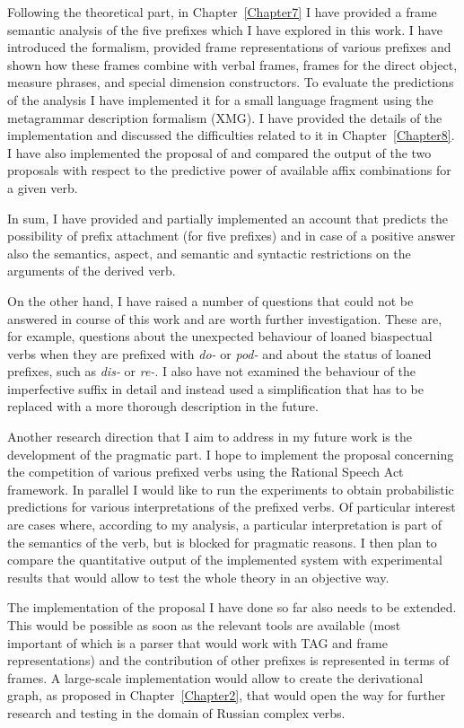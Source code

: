 Following the theoretical part,  in Chapter~\ref{Chapter7} I have provided a frame semantic analysis of the five prefixes which I have explored in this work. I have introduced the formalism, provided frame representations of various prefixes and shown how these frames combine with verbal frames, frames for the direct object, measure phrases, and special dimension constructors. To evaluate the predictions of the analysis I have implemented it for a small language fragment using the metagrammar description formalism (XMG). I have provided the details of the implementation and discussed the difficulties related to it in Chapter~\ref{Chapter8}. I have also implemented the proposal of \citet{Tatevosov:09} and compared the output of the two proposals with respect to the predictive power of available affix combinations for a given verb. 

In sum, I have provided and partially implemented an account that predicts the possibility of prefix attachment (for five prefixes) and in case of a positive answer also the semantics, aspect, and semantic and syntactic restrictions on the arguments of the derived verb. 

On the other hand, I have raised a number of questions that could not be answered in course of this work and are worth further investigation. These are, for example, questions about the unexpected behaviour of loaned biaspectual verbs when they are prefixed with \textit{do-} or \textit{pod-} and about the status of loaned prefixes, such as \textit{dis-} or \textit{re-}. I also have not examined the behaviour of the imperfective suffix in detail and instead used a simplification that has to be replaced with a more thorough description in the future. 

Another research direction that I aim to address in my future work is the development of the pragmatic part. I hope to implement the proposal concerning the competition of various prefixed verbs using the Rational Speech Act framework. In parallel I would like to run the experiments to obtain probabilistic predictions for various interpretations of the prefixed verbs.  Of particular interest are cases where, according to my analysis, a particular interpretation is part of the semantics of the verb, but is blocked for pragmatic reasons. I then plan to compare the quantitative output of the implemented system with experimental results that would allow to test the whole theory in an objective way.

The implementation of the proposal I have done so far also needs to be extended. This would be possible as soon as the relevant tools are available (most important of which is a parser that would work with TAG and frame representations) and the contribution of other prefixes is represented in terms of frames. A large-scale implementation would allow to create the derivational graph, as proposed in Chapter~\ref{Chapter2}, that would open the way for further research and testing in the domain of Russian complex verbs. 